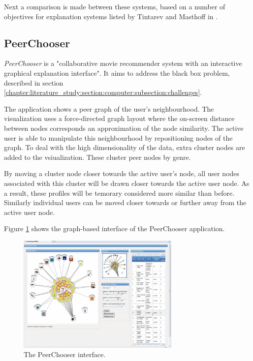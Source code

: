 Next a comparison is made between these systems, based on a number of objectives for explanation systems listed by Tintarev and Masthoff in \cite{tintarev:2007:SER:1547550.1547664}.


\subsection{PeerChooser}\label{chapter:survey:section:applications:subsection:peerchooser}

\emph{PeerChooser} is a "collaborative movie recommender system with an interactive graphical explanation interface"\cite{odonovan:2008}. It aims to address the black box problem, described in section \ref{chapter:literature_study:section:computer:subsection:challenges}\cite{odonovan:2008}.

The application shows a peer graph of the user's neighbourhood. The visualization uses a force-directed graph layout where the on-screen distance between nodes corresponds an approximation of the node similarity. The active user is able to manipulate this neighbourhood by repositioning nodes of the graph. To deal with the high dimensionality of the data, extra cluster nodes are added to the vsiualization. These cluster peer nodes by genre\cite{odonovan:2008}.

By moving a cluster node closer towards the active user's node, all user nodes associated with this cluster will be drawn closer towards the active user node. As a result, these profiles will be temorary considered more similar than before. Similarly individual users can be moved closer towards or further away from the active user node\cite{odonovan:2008}.

Figure \ref{figure:peerchooser} shows the graph-based interface of the PeerChooser application.

\begin{figure}%
	\begin{center}
		\includegraphics[width=300px]{img/peerchooser}%
	\end{center}
	\caption{The PeerChooser interface.}%
	\label{figure:peerchooser}%
\end{figure}



